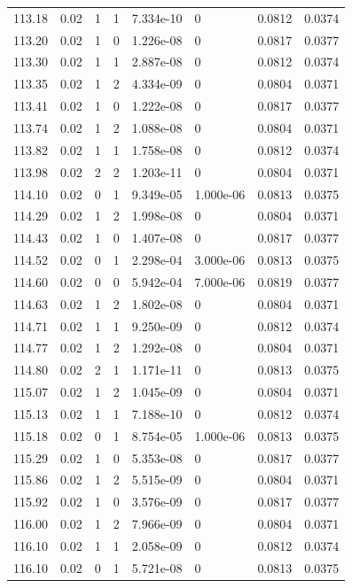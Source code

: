 \documentclass[preview]{standalone}
\begin{document}
{{{{{{{{{{{{{{{{{{\begin{tabular}{L{1.2cm}C{1.2cm} C{0.3cm}C{0.5cm} C{1.4cm}C{1.4cm} C{1.4cm}C{1.4cm}}
  113.18  &  0.02  & 1     &  1 &  7.334e-10  & 0  & 0.0812 &  0.0374   \\ 
  113.20  &  0.02  & 1     &  0 &  1.226e-08  & 0  & 0.0817 &  0.0377   \\ 
  113.30  &  0.02  & 1     &  1 &  2.887e-08  & 0  & 0.0812 &  0.0374   \\ 
  113.35  &  0.02  & 1     &  2 &  4.334e-09  & 0  & 0.0804 &  0.0371   \\ 
  113.41  &  0.02  & 1     &  0 &  1.222e-08  & 0  & 0.0817 &  0.0377   \\ 
  113.74  &  0.02  & 1     &  2 &  1.088e-08  & 0  & 0.0804 &  0.0371   \\ 
  113.82  &  0.02  & 1     &  1 &  1.758e-08  & 0  & 0.0812 &  0.0374   \\ 
  113.98  &  0.02  & 2     &  2 &  1.203e-11  & 0  & 0.0804 &  0.0371   \\ 
  114.10  &  0.02  & 0     &  1 &  9.349e-05  & 1.000e-06  & 0.0813 &  0.0375   \\ 
  114.29  &  0.02  & 1     &  2 &  1.998e-08  & 0  & 0.0804 &  0.0371   \\ 
  114.43  &  0.02  & 1     &  0 &  1.407e-08  & 0  & 0.0817 &  0.0377   \\ 
  114.52  &  0.02  & 0     &  1 &  2.298e-04  & 3.000e-06  & 0.0813 &  0.0375   \\ 
  114.60  &  0.02  & 0     &  0 &  5.942e-04  & 7.000e-06  & 0.0819 &  0.0377   \\ 
  114.63  &  0.02  & 1     &  2 &  1.802e-08  & 0  & 0.0804 &  0.0371   \\ 
  114.71  &  0.02  & 1     &  1 &  9.250e-09  & 0  & 0.0812 &  0.0374   \\ 
  114.77  &  0.02  & 1     &  2 &  1.292e-08  & 0  & 0.0804 &  0.0371   \\ 
  114.80  &  0.02  & 2     &  1 &  1.171e-11  & 0  & 0.0813 &  0.0375   \\ 
  115.07  &  0.02  & 1     &  2 &  1.045e-09  & 0  & 0.0804 &  0.0371   \\ 
  115.13  &  0.02  & 1     &  1 &  7.188e-10  & 0  & 0.0812 &  0.0374   \\ 
  115.18  &  0.02  & 0     &  1 &  8.754e-05  & 1.000e-06  & 0.0813 &  0.0375   \\ 
  115.29  &  0.02  & 1     &  0 &  5.353e-08  & 0  & 0.0817 &  0.0377   \\ 
  115.86  &  0.02  & 1     &  2 &  5.515e-09  & 0  & 0.0804 &  0.0371   \\ 
  115.92  &  0.02  & 1     &  0 &  3.576e-09  & 0  & 0.0817 &  0.0377   \\ 
  116.00  &  0.02  & 1     &  2 &  7.966e-09  & 0  & 0.0804 &  0.0371   \\ 
  116.10  &  0.02  & 1     &  1 &  2.058e-09  & 0  & 0.0812 &  0.0374   \\ 
  116.10  &  0.02  & 0     &  1 &  5.721e-08  & 0  & 0.0813 &  0.0375   \\ 
\hline 
\end{tabular} 

}}}}}}}}}}}}}}}}}}
\end{document}
